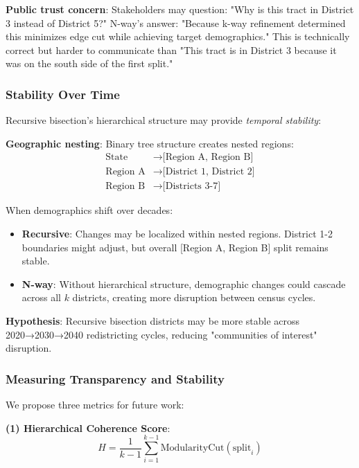 \textbf{Public trust concern}: Stakeholders may question: "Why is this tract in District 3 instead of District 5?" N-way's answer: "Because k-way refinement determined this minimizes edge cut while achieving target demographics." This is technically correct but harder to communicate than "This tract is in District 3 because it was on the south side of the first split."

\subsubsection{Stability Over Time}

Recursive bisection's hierarchical structure may provide \textit{temporal stability}:

\textbf{Geographic nesting}: Binary tree structure creates nested regions:
\begin{align*}
\text{State} &\to \text{[Region A, Region B]} \\
\text{Region A} &\to \text{[District 1, District 2]} \\
\text{Region B} &\to \text{[Districts 3-7]}
\end{align*}

When demographics shift over decades:
\begin{itemize}
\item \textbf{Recursive}: Changes may be localized within nested regions. District 1-2 boundaries might adjust, but overall [Region A, Region B] split remains stable.
\item \textbf{N-way}: Without hierarchical structure, demographic changes could cascade across all $k$ districts, creating more disruption between census cycles.
\end{itemize}

\textbf{Hypothesis}: Recursive bisection districts may be more stable across 2020→2030→2040 redistricting cycles, reducing "communities of interest" disruption.

\subsubsection{Measuring Transparency and Stability}

We propose three metrics for future work:

\textbf{(1) Hierarchical Coherence Score}:
\begin{equation}
H = \frac{1}{k-1} \sum_{i=1}^{k-1} \text{ModularityCut}(\text{split}_i)
\end{equation}


